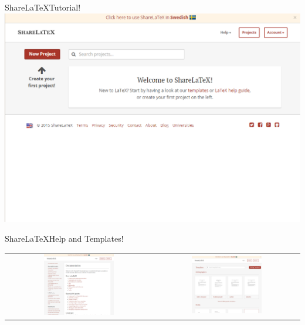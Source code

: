 \begin{frame}{Share\LaTeX}{Tutorial!}
    \includegraphics[width=\textwidth]{img/1-sharelatex2.png}
\end{frame}

\begin{frame}{Share\LaTeX}{Help and Templates!}
	\begin{tabular}{c c}
		\includegraphics[width=0.5\textwidth]{img/1-sharelatex3-1.png} & \includegraphics[width=0.5\textwidth]{img/1-sharelatex3-2.png}
	\end{tabular}
\end{frame}
